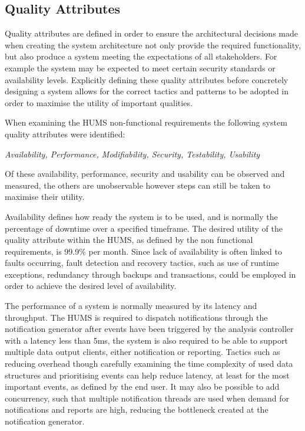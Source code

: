 \documentclass[10pt,a4paper]{article}
\begin{document}
\subsection{Quality Attributes}
Quality attributes are defined in order to ensure the architectural decisions made when 
creating the system architecture not only provide the required functionality,
but also produce a system meeting the expectations of all stakeholders. For example the 
system may be expected to meet certain security standards or availability levels. 
Explicitly defining these quality attributes before concretely designing a system allows for 
the correct tactics and patterns to be adopted in order to maximise the utility of important 
qualities.

When examining the HUMS non-functional requirements the following system quality 
attributes were identified:
	\begin{center}
	\textit{
		Availability, Performance, Modifiability, Security, Testability, Usability}
	\end{center}
Of these availability, performance, security and usability can be observed and measured, 
the others are unobservable however steps can still be taken to maximise their utility.

Availability defines how ready the system is to be used, and is normally the percentage of 
downtime over a specified timeframe. The desired utility of the quality attribute within the HUMS, as defined by the non functional requirements, is  99.9\% per month. Since lack of 
availability is often linked to faults occurring, fault detection and recovery tactics, such as 
use of runtime exceptions, redundancy through backups and transactions, could be 
employed in order to achieve the desired level of availability. 

The performance of a system is normally measured by its latency and throughput. The 
HUMS is required to dispatch notifications through the notification generator after events 
have been triggered by the analysis controller with a latency less than 5ms, the system is 
also required to be able to support multiple data output clients, either notification or 
reporting. Tactics such as reducing overhead though carefully examining the time 
complexity of used data structures and prioritising events can help reduce latency, at 
least for the most important events, as defined by the end user. It may also be possible to 
add concurrency, such that multiple notification threads are used when demand for 
notifications and reports are high, reducing the bottleneck created at the notification 
generator.
\end{document}
